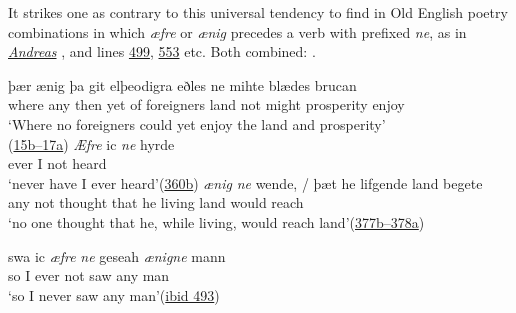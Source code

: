 It strikes one as contrary to this universal tendency to find in Old English poetry combinations in which \textit{æfre} or \textit{ænig} precedes a verb with prefixed \textit{ne}, as in \href{https://archive.org/details/andreasandfateso00cyneuoft/andreasandfateso00cyneuoft/mode/2up?ref=ol&view=theater}{\textit{Andreas}} , and lines \href{https://archive.org/details/andreasandfateso00cyneuoft/andreasandfateso00cyneuoft/page/20/mode/2up?ref=ol&view=theater}{499}, \href{https://archive.org/details/andreasandfateso00cyneuoft/andreasandfateso00cyneuoft/page/22/mode/2up?ref=ol&view=theater}{553} etc. Both combined: .

\ea \label{ex:06-33}
\ea
 \gll þær ænig þa git elþeodigra eðles ne mihte blædes brucan\\
 where any then yet {of foreigners} land not might prosperity enjoy\\
\glt `Where no foreigners could yet enjoy the land and prosperity'\\\hfill(\href{https://archive.org/details/andreasandfateso00cyneuoft/andreasandfateso00cyneuoft/page/2/mode/2up?ref=ol&view=theater}{15b–17a}) %
\ex \gll \textit{Æfre} ic \textit{ne} hyrde\\
 ever I not heard\\
\glt `never have I ever heard'\hfill(\href{https://archive.org/details/andreasandfateso00cyneuoft/andreasandfateso00cyneuoft/page/14/mode/2up?ref=ol&view=theater}{360b})
\ex \gll \textit{ænig} \textit{ne} wende, / þæt he lifgende land begete\\
 any not thought {} that he living land {would reach}\\
\glt `no one thought that he, while living, would reach land'\hfill(\href{https://archive.org/details/andreasandfateso00cyneuoft/andreasandfateso00cyneuoft/page/14/mode/2up?ref=ol&view=theater}{377b–378a})
\z
\z{}

\ea \label{ex:06-34}
 \gll swa ic \textit{æfre} \textit{ne} geseah \textit{ænigne} mann\\
 so I ever not saw any man\\
\glt `so I never saw any man'\hfill(\href{https://archive.org/details/andreasandfateso00cyneuoft/andreasandfateso00cyneuoft/page/20/mode/2up?ref=ol&view=theater}{ibid 493})
\z{}

